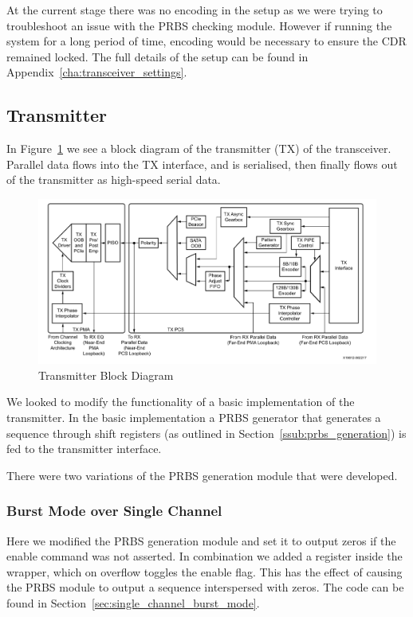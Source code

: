 At the current stage there was no encoding in the setup as we were trying to
troubleshoot an issue with the PRBS checking module. However if running the
system for a long period of time, encoding would be necessary to ensure the CDR
remained locked.
The full details of the setup can be found in
Appendix~\ref{cha:transceiver_settings}.


\subsection{Transmitter}%
\label{sub:transmitter}
In Figure~\ref{fig:transmitter_block} we see a block diagram of the transmitter
(TX) of the transceiver. Parallel data flows into the TX interface,
and is serialised, then finally flows out of the transmitter as high-speed
serial data.

\begin{figure}[ht]
    \centering
    \hspace*{-1cm}\includegraphics[width=1.2\linewidth]{img/transmitter_block.png}
    \caption{Transmitter Block Diagram~\cite{GTY_guide} }%
    \label{fig:transmitter_block}
\end{figure}

We looked to modify the functionality of a basic implementation of the
transmitter. In the basic implementation a PRBS generator that generates a
sequence through shift registers (as outlined in
Section~\ref{ssub:prbs_generation}) is fed to the transmitter interface. 

There were two variations of the PRBS generation module that were developed.

\subsubsection{Burst Mode over Single Channel}%
\label{ssub:burst_mode_over_single_channel}
Here we modified the PRBS generation module and set it to output zeros if the
enable command was not asserted.  In combination we added a register
inside the wrapper, which on overflow toggles the enable flag. This has the
effect of causing the PRBS module to output a sequence interspersed with zeros.
The code can be found in Section~\ref{sec:single_channel_burst_mode}.


